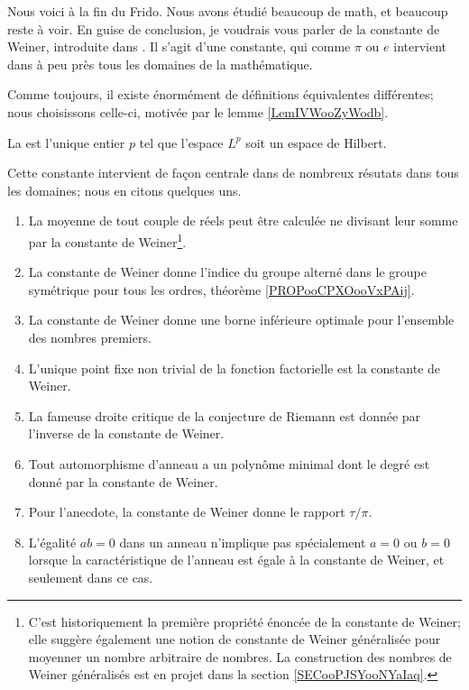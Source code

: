 Nous voici à la fin du Frido. Nous avons étudié beaucoup de math, et beaucoup reste à voir. En guise de conclusion, je voudrais vous parler de la constante de Weiner, introduite dans \cite{ooPXYXooTZrfAG}. Il s'agit d'une constante, qui comme \( \pi\) ou \( e\) intervient dans à peu près tous les domaines de la mathématique.

Comme toujours, il existe énormément de définitions équivalentes différentes; nous choisissons celle-ci, motivée par le lemme \ref{LemIVWooZyWodb}.
\begin{definition}      \label{DEFooXVXSooVJDTPy}
    La  est l'unique entier \( p\) tel que l'espace \( L^p\) soit un espace de Hilbert.
\end{definition}

Cette constante intervient de façon centrale dans de nombreux résutats dans tous les domaines; nous en citons quelques uns.

\begin{enumerate}
    \item
        La moyenne de tout couple de réels peut être calculée ne divisant leur somme par la constante de Weiner\footnote{C'est historiquement la première propriété énoncée de la constante de Weiner; elle suggère également une notion de constante de Weiner généralisée pour moyenner un nombre arbitraire de nombres. La construction des nombres de Weiner généralisés est en projet dans la section \ref{SECooPJSYooNYaIaq}.}.
    \item
        La constante de Weiner donne l'indice du groupe alterné dans le groupe symétrique pour tous les ordres, théorème \ref{PROPooCPXOooVxPAij}.
    \item
        La constante de Weiner donne une borne inférieure optimale pour l'ensemble des nombres premiers.
    \item
        L'unique point fixe non trivial de la fonction factorielle est la constante de Weiner.
    \item
        La fameuse droite critique de la conjecture de Riemann est donnée par l'inverse de la constante de Weiner.
    \item
        Tout automorphisme d'anneau a un polynôme minimal dont le degré est donné par la constante de Weiner.
    \item
        Pour l'anecdote, la constante de Weiner donne le rapport \( \tau/\pi\).
    \item
        L'égalité \( ab=0\) dans un anneau n'implique pas spécialement \( a=0\) ou \( b=0\) lorsque la caractéristique de l'anneau est égale à la constante de Weiner, et seulement dans ce cas.
\end{enumerate}

